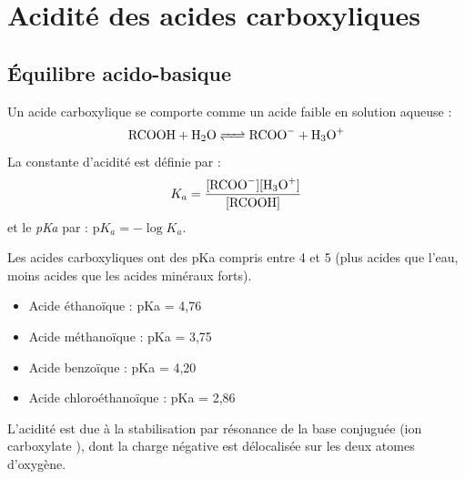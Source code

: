 \begin{illustration}
\begin{center}
\end{center}
\end{illustration}

\section{Acidité des acides carboxyliques}

\subsection{Équilibre acido-basique}

\begin{loi}
Un acide carboxylique  se comporte comme un acide faible en solution aqueuse :
\[
\ce{RCOOH + H2O <=> RCOO- + H3O+}
\]
La constante d'acidité est définie par :
\[
K_a = \frac{[\ce{RCOO-}][\ce{H3O+}]}{[\ce{RCOOH}]}
\]
et le \textit{pKa} par : $\text{p}K_a = -\log K_a$.
\end{loi}

\begin{propriete}
Les acides carboxyliques ont des pKa compris entre 4 et 5 (plus acides que l'eau, moins acides que les acides minéraux forts).
\begin{itemize}
    \item Acide éthanoïque : pKa = 4,76
    \item Acide méthanoïque : pKa = 3,75
    \item Acide benzoïque : pKa = 4,20
    \item Acide chloroéthanoïque : pKa = 2,86
\end{itemize}
\end{propriete}

\begin{remarque}
L'acidité est due à la stabilisation par résonance de la base conjuguée (ion carboxylate ), dont la charge négative est délocalisée sur les deux atomes d'oxygène.
\end{remarque}

\begin{illustration}
\begin{center}
 \hspace{1cm} 
\end{center}
\end{illustration}

